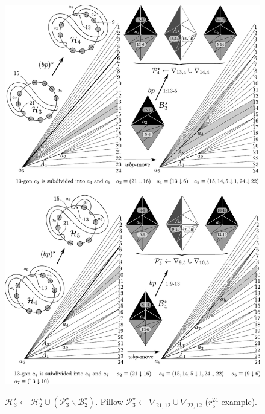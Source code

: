 \begin{figure}
\begin{center}
\includegraphics[width=15cm]{A.figs/bpandwinglist345.pdf} \\
\caption{\sf 
$\mathcal{H}^\star_{3} \leftarrow \mathcal{H}^\star_2 
\cup (\mathcal{P}_{3}^\star \backslash \mathcal{B}_2^\star)$. 
Pillow $\mathcal{P}_{3}^\star \leftarrow 
\nabla_{21,12}\cup \nabla_{22,12}$
($r^{24}_5$-example).}
\label{fig:winglist02}
\end{center}
\end{figure}

